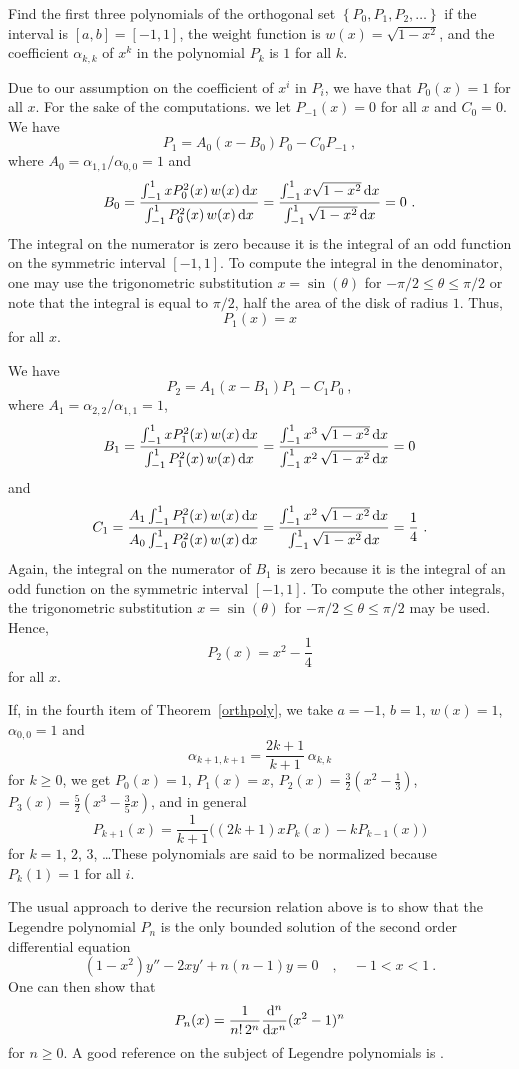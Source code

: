 \begin{egg}
Find the first three polynomials of the orthogonal set
$\left\{ P_0,P_1,P_2,\ldots \right\}$ if the interval is
$[a,b]=[-1,1]$, the weight function is $w(x)=\sqrt{1-x^2}$, and the
coefficient $\alpha_{k,k}$ of $x^k$ in the polynomial $P_k$ is $1$ for all
$k$.

Due to our assumption on the coefficient of $x^i$ in $P_i$, we have
that $P_0(x) = 1$ for all $x$.  For the sake of the computations. we
let $P_{-1}(x)=0$ for all $x$ and $C_0=0$.
We have
\[
P_1 = A_0 (x-B_0)P_0 -C_0 P_{-1}\  ,
\]
where $A_0 = \alpha_{1,1}/\alpha_{0,0} = 1$ and
\[
B_0 = \frac{\int_{-1}^1 x P_0^2(x)\, w(x) \dx{x}}
{\int_{-1}^1 P_0^2(x)\, w(x) \dx{x}}
= \frac{\int_{-1}^1 x \sqrt{1-x^2} \dx{x}}
{\int_{-1}^1 \sqrt{1-x^2} \dx{x}} = 0 \  .
\]
The integral on the numerator is zero because it is the integral of an
odd function on the symmetric interval $[-1,1]$.  To compute the integral
in the denominator, one may use the trigonometric substitution
$x=\sin(\theta)$ for $-\pi/2 \leq \theta \leq \pi/2$ or note that the
integral is equal to $\pi/2$, half the area of the disk of radius $1$.  Thus,
\[
P_1(x) = x
\]
for all $x$.

We have
\[
P_2 = A_1 (x-B_1)P_1 -C_1 P_0 \  ,
\]
where $A_1 = \alpha_{2,2}/\alpha_{1,1} = 1$,
\[
B_1 = \frac{\int_{-1}^1 x P_1^2(x)\, w(x) \dx{x}}
{\int_{-1}^1 P_1^2(x)\, w(x)\dx{x}}
=  \frac{\int_{-1}^1 x^3\, \sqrt{1-x^2} \dx{x}}
{\int_{-1}^1 x^2\,\sqrt{1-x^2}\dx{x}}
= 0
\]
and
\[
C_1 = \frac{A_1 \int_{-1}^1 P_1^2(x)\, w(x) \dx{x}}
{A_0 \int_{-1}^1 P_0^2(x)\, w(x)\dx{x}}
= \frac{\int_{-1}^1 x^2\,\sqrt{1-x^2} \dx{x}}
{\int_{-1}^1 \sqrt{1-x^2}\dx{x}}
= \frac{1}{4} \  .
\]
Again, the integral on the numerator of $B_1$ is zero because it is
the integral of an odd function on the symmetric interval $[-1,1]$.
To compute the other integrals, the trigonometric
substitution $x=\sin(\theta)$ for $-\pi/2 \leq \theta \leq \pi/2$ may
be used.  Hence,
\[
P_2(x) = x^2  -\frac{1}{4}
\]
for all $x$.
\end{egg}

\begin{egg}
If, in the fourth item of Theorem~\ref{orthpoly}, we take $a=-1$,
$b=1$, $w(x) = 1$, $\alpha_{0,0} = 1$ and
\[
\alpha_{k+1,k+1} = \frac{2k+1}{k+1}\, \alpha_{k,k}
\]
for $k \geq 0$, we get $P_0(x) = 1$, $P_1(x) = x$,
$\displaystyle P_2(x) = \frac{3}{2}\left(x^2- \frac{1}{3}\right)$,
$\displaystyle P_3(x) = \frac{5}{2}\left(x^3 -\frac{3}{5} x\right)$,
and in general
\[
  P_{k+1}(x) = \frac{1}{k+1}\big( (2k+1)xP_k(x) -k P_{k-1}(x) \big)
\]
for $k=1$, $2$, $3$, \ldots\quad These polynomials are said to be
normalized because $P_k(1) = 1$ for all $i$.

The usual approach to derive the recursion relation above is to show
that the Legendre polynomial $P_n$ is the only bounded solution of the
second order differential equation
\[
  (1-x^2) y'' - 2 xy' +n(n-1) y = 0 \quad , \quad -1 < x < 1 \ .
\]
One can then show that
\[
  P_n(x) = \frac{1}{n!\, 2^n} \dfdxn{(x^2-1)^n}{x}{n}
\]
for $n \geq 0$.  A good reference on the subject of Legendre
polynomials is \cite{GS}.
\end{egg}

